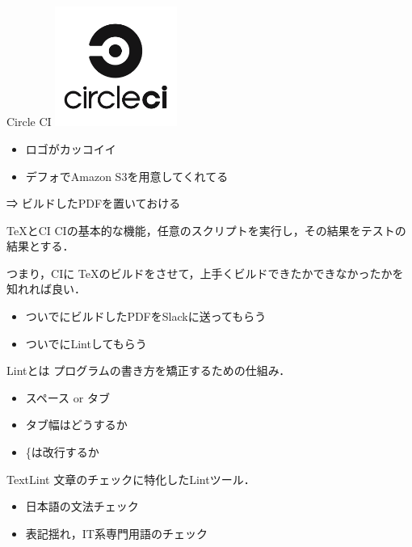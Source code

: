 \documentclass{beamer}
\begin{document}
\begin{frame}{Circle CI}
  \includegraphics[width=4cm, bb=0 0 140 137]{img/circle-logo-stacked-black.png}

  \begin{itemize}
    \item ロゴがカッコイイ
    \item デフォでAmazon S3を用意してくれてる
  \end{itemize}

  ⇒ ビルドしたPDFを置いておける
\end{frame}

\begin{frame}{\TeX とCI}
  CIの基本的な機能，任意のスクリプトを実行し，その結果をテストの結果とする．

  つまり，CIに \TeX のビルドをさせて，上手くビルドできたかできなかったかを知れれば良い．

  \begin{itemize}
    \item ついでにビルドしたPDFをSlackに送ってもらう
    \item ついでにLintしてもらう
  \end{itemize}
\end{frame}

\begin{frame}{Lintとは}
  プログラムの書き方を矯正するための仕組み．

  \begin{itemize}
    \item スペース or タブ
    \item タブ幅はどうするか
    \item \{は改行するか
  \end{itemize}
\end{frame}

\begin{frame}{TextLint}
  文章のチェックに特化したLintツール．

  \begin{itemize}
    \item 日本語の文法チェック
    \item 表記揺れ，IT系専門用語のチェック
  \end{itemize}
\end{frame}
\end{document}
